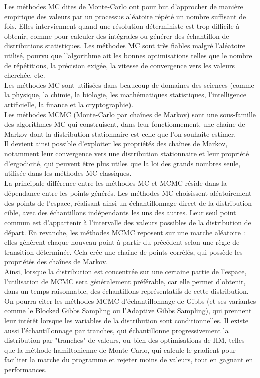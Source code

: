 \documentclass{article}
\begin{document}
Les méthodes MC dites de Monte-Carlo ont pour but d'approcher de manière empirique des valeurs par un processus aléatoire répété un nombre suffisant de fois. Elles interviennent quand une résolution déterministe est trop difficile à obtenir, comme pour calculer des intégrales ou générer des échantillon de distributions statistiques. Les méthodes MC sont très fiables malgré l'aléatoire utilisé, pourvu que l'algorithme ait les bonnes optimisations telles que le nombre de répétitions, la précision exigée, la vitesse de convergence vers les valeurs cherchée, etc. \\
Les méthodes MC sont utilisées dans beaucoup de domaines des sciences (comme la physique, la chimie, la biologie, les mathématiques statistiques, l'intelligence artificielle, la finance et la cryptographie). \\

Les méthodes MCMC (Monte-Carlo par chaînes de Markov) sont une sous-famille des algorithmes MC qui construisent, dans leur fonctionnement, une chaîne de Markov dont la distribution stationnaire est celle que l’on souhaite estimer. \\
Il devient ainsi possible d'exploiter les propriétés des chaînes de Markov, notamment leur convergence vers une distribution stationnaire et leur propriété d'ergodicité, qui peuvent être plus utiles que la loi des grands nombres seule, utilisée dans les méthodes MC classiques. \\
La principale différence entre les méthodes MC et MCMC réside dans la dépendance entre les points générés. Les méthodes MC choisissent aléatoirement des points de l'espace, réalisant ainsi un échantillonnage direct de la distribution cible, avec des échantillons indépendants les uns des autres. Leur seul point commun est d'appartenir à l'intervalle des valeurs possibles de la distribution de départ. En revanche, les méthodes MCMC reposent sur une marche aléatoire : elles génèrent chaque nouveau point à partir du précédent selon une règle de transition déterminée. Cela crée une chaîne de points corrélés, qui possède les propriétés des chaînes de Markov. \\
Ainsi, lorsque la distribution est concentrée sur une certaine partie de l'espace, l’utilisation de MCMC sera généralement préférable, car elle permet d'obtenir, dans un temps raisonnable, des échantillons représentatifs de cette distribution. \\

On pourra citer les méthodes MCMC d'échantillonnage de Gibbs (et ses variantes comme le Blocked Gibbs Sampling ou l'Adaptive Gibbs Sampling), qui prennent leur intérêt lorsque les variables de la distribution sont conditionnelles. Il existe aussi l’échantillonnage par tranches, qui échantillonne progressivement la distribution par "tranches" de valeurs, ou bien des optimisations de HM, telles que la méthode hamiltonienne de Monte-Carlo, qui calcule le gradient pour faciliter la marche du programme et rejeter moins de valeurs, tout en gagnant en performances. \\
\end{document}

